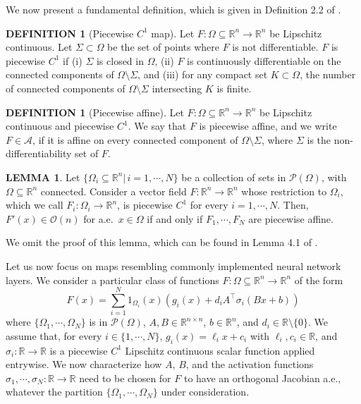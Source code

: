 \documentclass{article}
\newcommand{\R}{\mathbb{R}}
\theoremstyle{plain}
\theoremstyle{definition}
\newtheorem{definition}[theorem]{DEFINITION}
\theoremstyle{definition}
\newtheorem{lemma}[theorem]{LEMMA}
\theoremstyle{remark}
\theoremstyle{definition}
\theoremstyle{definition}
\theoremstyle{remark}
\numberwithin{equation}{section}
\begin{document}
We now present a fundamental definition, which is given in Definition 2.2 of \cite{dacorogna2008lipschitz}.
\begin{definition}[Piecewise $C^1$ map]
Let $F:\Omega\subseteq\mathbb{R}^n\to\mathbb{R}^n$ be Lipschitz continuous. Let $\Sigma\subset\Omega$ be the set of points where $F$ is not differentiable. $F$ is piecewise $C^1$ if (i) $\Sigma$ is closed in $\Omega$, (ii) $F$ is continuously differentiable on the connected components of $\Omega\setminus\Sigma$, and (iii) for any compact set $K\subset\Omega$, the number of connected components of $\Omega\setminus\Sigma$ intersecting $K$ is finite.
\end{definition}
\begin{definition}[Piecewise affine]
Let $F:\Omega\subseteq\mathbb{R}^n\to\mathbb{R}^n$ be Lipschitz continuous and piecewise $C^1$. We say that $F$ is piecewise affine, and we write $F \in \mathscr{A}$, if it is affine on every connected component of $\Omega\setminus\Sigma$, where $\Sigma$ is the non-differentiability set of $F$.
\end{definition}
\begin{lemma}\label{lemma:char_orth_field}
Let $\{\Omega_i\subseteq\mathbb{R}^n|\,i=1,\cdots,N\}$ be a collection of sets in $\mathcal{P}(\Omega)$, with $\Omega\subseteq\mathbb{R}^n$ connected. Consider a vector field $F:\mathbb{R}^n\to\mathbb{R}^n$ whose restriction to $\Omega_i$, which we call $F_i:\Omega_i\to\mathbb{R}^n$, is piecewise $C^1$ for every $i=1,\cdots,N$. Then, $F'(x) \in \mathcal{O}(n)$ for a.e.\, $x\in\Omega$ if and only if $F_1,\cdots,F_N$ are piecewise affine.
\end{lemma}
We omit the proof of this lemma, which can be found in Lemma 4.1 of \cite{dacorogna2008lipschitz}.

Let us now focus on maps resembling commonly implemented neural network layers. We consider a particular class of functions $F:\Omega\subseteq\mathbb{R}^n\to\mathbb{R}^n$ of the form
\begin{equation}\label{eq:focusMap}
F(x) = \sum_{i=1}^N 1_{\Omega_i}(x)\left( g_i(x) + d_iA^\top \sigma_i(Bx+b)\right)
\end{equation}
where $\{\Omega_1,\cdots,\Omega_N\}$ is in $\mathcal{P}(\Omega)$, $A,B\in\mathbb{R}^{n\times n}$, $b\in\mathbb{R}^n$, and $d_i\in\mathbb{R}\setminus \{0\}$. We assume that, for every $i\in\{1,\cdots,N\}$, $g_i(x)=\ell_i x + c_i$ with $\ell_i,c_i\in\mathbb{R}$, and $\sigma_i:\R\to\R$ is a piecewise $C^1$ Lipschitz continuous scalar function applied entrywise. We now characterize how $A$, $B$, and the activation functions $\sigma_1,\cdots,\sigma_N:\mathbb{R}\to\mathbb{R}$ need to be chosen for $F$ to have an orthogonal Jacobian a.e., whatever the partition $\{\Omega_1,\cdots,\Omega_N\}$ under consideration.
\end{document}
